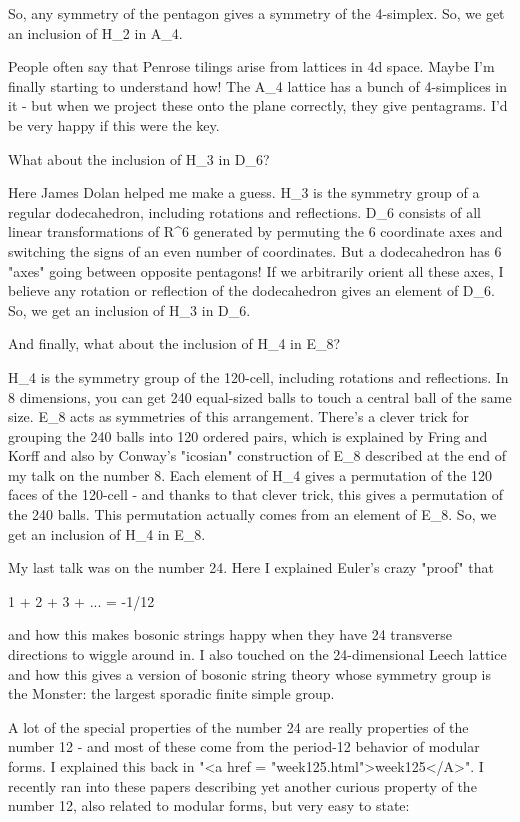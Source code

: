 So, any symmetry of the 
pentagon gives a symmetry of the 4-simplex.  So, we get an inclusion
of H_{2} in A_{4}. 

People often say that Penrose tilings arise from lattices in 4d space.  
Maybe I'm finally starting to understand how!  The A_{4} lattice has a 
bunch of 4-simplices in it - but when we project these onto the plane 
correctly, they give pentagrams.   I'd be very happy if this were
the key.

What about the inclusion of H_{3} in D_{6}?

Here James Dolan helped me make a guess.  H_{3} is the
symmetry group of a regular dodecahedron, including rotations and
reflections.  D_{6} consists of all linear transformations of
R^{6} generated by permuting the 6 coordinate axes and
switching the signs of an even number of coordinates.  But a
dodecahedron has 6 "axes" going between opposite pentagons!
If we arbitrarily orient all these axes, I believe any rotation or
reflection of the dodecahedron gives an element of D_{6}.  So,
we get an inclusion of H_{3} in D_{6}.

And finally, what about the inclusion of H_{4} in E_{8}?  

H_{4} is the symmetry group of the 120-cell, including
rotations and reflections.  In 8 dimensions, you can get 240
equal-sized balls to touch a central ball of the same size.
E_{8} acts as symmetries of this arrangement.  There's a
clever trick for grouping the 240 balls into 120 ordered pairs, which
is explained by Fring and Korff and also by Conway's "icosian"
construction of E_{8} described at the end of my talk on the
number 8.  Each element of H_{4} gives a permutation of the
120 faces of the 120-cell - and thanks to that clever trick, this
gives a permutation of the 240 balls.  This permutation actually comes
from an element of E_{8}.  So, we get an inclusion of
H_{4} in E_{8}.

My last talk was on the number 24.  Here I explained Euler's crazy
"proof" that

1 + 2 + 3 + ... = -1/12

and how this makes bosonic strings happy when they have 24 transverse
directions to wiggle around in.  I also touched on the 24-dimensional
Leech lattice and how this gives a version of bosonic string theory
whose symmetry group is the Monster: the largest sporadic finite simple group.

A lot of the special properties of the number 24 are really properties
of the number 12 - and most of these come from the period-12 behavior
of modular forms.  I explained this back in "<a href =
"week125.html">week125</A>".  I recently ran into these papers
describing yet another curious property of the number 12, also related
to modular forms, but very easy to state:

